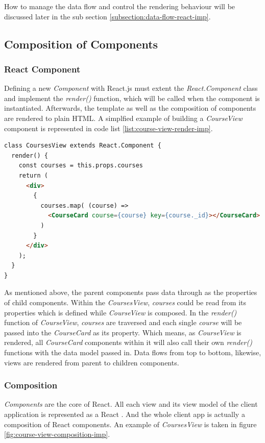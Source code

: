 How to manage the data flow and control the rendering behaviour will be discussed later in the sub section \ref{subsection:data-flow-react-imp}.


\subsection{Composition of Components}

\subsubsection{React Component}

Defining a new \textit{Component} with React.js must extent the \textit{React.Component} class and implement the \textit{render()} function, which will be called when the component is instantiated. Afterwards, the template as well as the composition of components are rendered to plain HTML.  A simplfied example of building a \textit{CourseView} component is represented in code list \ref{list:course-view-render-imp}.

\begin{lstlisting}[language=HTML, caption=Rendering \textit{CourseView} with multiple \textit{CourseCard} components , label={list:course-view-render-imp}]
class CoursesView extends React.Component {
  render() {
    const courses = this.props.courses
    return (
      <div>
        {
          courses.map( (course) =>
            <CourseCard course={course} key={course._id}></CourseCard>
          )
        }
      </div>
    ); 
  }
}
\end{lstlisting}

As mentioned above, the parent components pass data through as the properties of child components. Within the \textit{CoursesView}, \textit{courses} could be read from its properties which is defined while \textit{CourseView} is composed. In the \textit{render()} function of \textit{CourseView}, \textit{courses} are traversed and each single \textit{course} will be passed into the \textit{CourseCard} as its property. Which means, as \textit{CourseView} is rendered, all \textit{CourseCard} components within it will also call their own \textit{render()} functions with the data model passed in. Data flows from top to bottom, likewise, views are rendered from parent to children components.

\subsubsection{Composition}
\textit{Components} are the core of React. All each view and its view model of the client application is represented as a React . And the whole client app is actually a composition of React components. An example of \textit{CoursesView} is taken in figure \ref{fig:course-view-composition-imp}.

